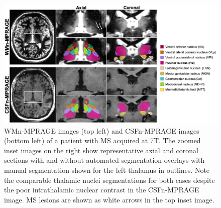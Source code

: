 \bgroup
{}
\begin{figure}[!htbp]
\centering \includegraphics{Thalamus/images/slide5.jpeg}
\makeatother 
\caption{WMn-MPRAGE images (top left) and CSFn-MPRAGE images (bottom left) of a patient with MS acquired at 7T. The zoomed inset images on the right show representative axial and coronal sections with and without automated segmentation overlays with manual segmentation shown for the left thalamus in outlines. Note the comparable thalamic nuclei segmentations for both cases despite the poor intrathalamic nuclear contrast in the CSFn-MPRAGE image. MS lesions are shown as white arrows in the top inset image. }
\label{f-7433626f60be}
\end{figure}
\egroup




